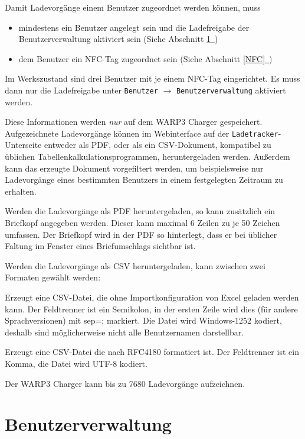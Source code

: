 \documentclass[a4paper,10pt]{article}
\newcommand{\hint}[1]{\begin{tcolorbox}[colback=boxgray,colframe=black,coltext=
white,title=Hinweis,left*=2mm,right*=2mm,boxsep=1mm,bottom=1mm,top=1mm]#1\end{tcolorbox}}
\newcommand*{\fullref}[1]{Abschnitt \hyperref[{#1}]{\ref*{#1}~\nameref*{#1}}}
\begin{document}
\begin{multicols*}{2}
    \hint{Damit Ladevorgänge einem Benutzer zugeordnet werden können, muss
        \begin{itemize}
            \item mindestens ein Benutzer angelegt sein und die Lade­freigabe der Benutzerverwaltung aktiviert sein (Siehe \fullref{user_management})
            \item dem Benutzer ein NFC-Tag zugeordnet sein (Siehe \fullref{NFC})
        \end{itemize}
        Im Werkszustand sind drei Benutzer mit je einem NFC-Tag eingerichtet. Es muss dann nur die Lade­freigabe unter \texttt{Benutzer} $\rightarrow$ \texttt{Benutzerverwaltung} aktiviert werden.
    }

    Diese Informationen werden \textit{nur} auf dem WARP3 Charger gespeichert.
    Aufgezeichnete Ladevorgänge können im Webinterface auf der \texttt{Ladetracker}-Unterseite entweder als PDF, oder als ein CSV-Dokument,
    kompatibel zu üblichen Tabellenkalkulationsprogrammen, heruntergeladen werden. Außerdem kann das erzeugte Dokument
    vorgefiltert werden, um beispielsweise nur Ladevorgänge eines bestimmten Benutzers in einem festgelegten Zeitraum zu erhalten.

    Werden die Ladevorgänge als PDF heruntergeladen, so kann zusätzlich ein
	Briefkopf angegeben werden. Dieser kann maximal 6 Zeilen zu je 50 Zeichen
    umfassen. Der Briefkopf wird in der PDF so hinterlegt, dass er bei üblicher Faltung im Fenster eines Briefumschlags sichtbar ist.

    Werden die Ladevorgänge als CSV heruntergeladen, kann zwischen zwei Formaten
	gewählt werden:
    \begin{description}[labelindent=0.5cm, leftmargin=0.5cm]
     \item[Excel-kompatibel] Erzeugt eine CSV-Datei, die ohne Importkonfiguration von Excel geladen werden kann. Der Feldtrenner ist ein Semikolon, in der ersten Zeile wird dies (für andere Sprachversionen) mit sep=; markiert. Die Datei wird Windows-1252 kodiert, deshalb sind möglicherweise nicht alle Benutzernamen darstellbar.
     \item[RFC4180] Erzeugt eine CSV-Datei die nach RFC4180 formatiert ist. Der Feldtrenner ist ein Komma, die Datei wird UTF-8 kodiert.
    \end{description}

    Der WARP3 Charger kann bis zu 7680 Ladevorgänge aufzeichnen.

    \newpage
    \section{Benutzerverwaltung} \label{user_management}


\end{multicols*}
\end{document}
